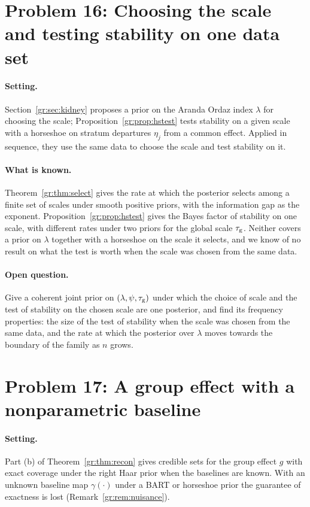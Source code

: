 \section{Problem 16: Choosing the scale and testing stability on one data set}

\paragraph{Setting.} Section~\ref{gr:sec:kidney} proposes a prior on the Aranda Ordaz index $\lambda$ for choosing the scale; Proposition~\ref{gr:prop:hstest} tests stability on a given scale with a horseshoe on stratum departures $\eta_j$ from a common effect. Applied in sequence, they use the same data to choose the scale and test stability on it.

\paragraph{What is known.} Theorem~\ref{gr:thm:select} gives the rate at which the posterior selects among a finite set of scales under smooth positive priors, with the information gap as the exponent. Proposition~\ref{gr:prop:hstest} gives the Bayes factor of stability on one scale, with different rates under two priors for the global scale $\tau_{\mathrm{g}}$. Neither covers a prior on $\lambda$ together with a horseshoe on the scale it selects, and we know of no result on what the test is worth when the scale was chosen from the same data.

\paragraph{Open question.} Give a coherent joint prior on $(\lambda,\psi,\tau_{\mathrm{g}})$ under which the choice of scale and the test of stability on the chosen scale are one posterior, and find its frequency properties: the size of the test of stability when the scale was chosen from the same data, and the rate at which the posterior over $\lambda$ moves towards the boundary of the family as $n$ grows.

\section{Problem 17: A group effect with a nonparametric baseline}

\paragraph{Setting.} Part (b) of Theorem~\ref{gr:thm:recon} gives credible sets for the group effect $g$ with exact coverage under the right Haar prior when the baselines are known. With an unknown baseline map $\gamma(\cdot)$ under a BART or horseshoe prior the guarantee of exactness is lost (Remark~\ref{gr:rem:nuisance}).


